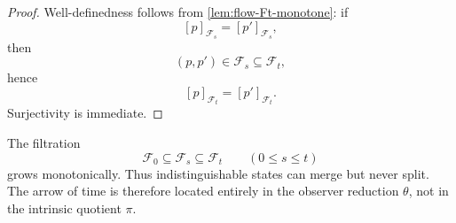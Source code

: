 \begin{proof}
	Well-definedness follows from \cref{lem:flow-Ft-monotone}: if
	\[
		[p]_{\mathcal F_s}=[p']_{\mathcal F_s},
	\]
	then
	\[
		(p,p')\in \mathcal F_s\subseteq \mathcal F_t,
	\]
	hence
	\[
		[p]_{\mathcal F_t}=[p']_{\mathcal F_t}.
	\]
	Surjectivity is immediate.
\end{proof}
\begin{remark}
	The filtration
	\[
		\mathcal F_0\subseteq \mathcal F_s\subseteq \mathcal F_t
		\qquad
		(0\le s\le t)
	\]
	grows monotonically. Thus indistinguishable states can merge but never
	split. The arrow of time is therefore located entirely in the observer
	reduction \(\theta\), not in the intrinsic quotient \(\pi\).
\end{remark}
